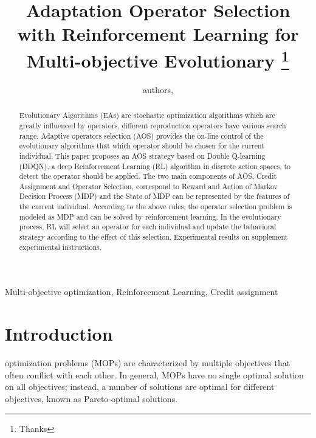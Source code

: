 \documentclass[journal]{IEEEtran}
\newcommand{\TODO}[1]{\textcolor[rgb]{1.00,0.40,0.22}{#1}}
\begin{document}
\title{{Adaptation Operator Selection with Reinforcement Learning for Multi-objective Evolutionary}
  \thanks{Thanks}}
\author{
  authors,
}%



\maketitle

\begin{abstract}
  Evolutionary Algorithms (EAs) are stochastic optimization algorithms which are greatly influenced by operators, different reproduction operators have various search range.
  Adaptive operators selection (AOS) provides the on-line control of the evolutionary algorithms that which operator should be chosen for the current individual.
  This paper proposes an AOS strategy based on Double Q-learning (DDQN), a deep Reinforcement Learning (RL) algorithm in discrete action spaces, to detect the operator should be applied.
  The two main components of AOS, Credit Assignment and Operator Selection, correspond to Reward and Action of Markov Decision Process (MDP) and the State of MDP can be represented by the features of the current individual. According to the above rules, the operator selection problem is modeled as MDP and can be solved by reinforcement learning. In the evolutionary process, RL will select an operator for each individual and update the behavioral strategy according to the effect of this selection. Experimental results on \TODO{supplement experimental instructions}.
\end{abstract}

\begin{IEEEkeywords}
  Multi-objective optimization, Reinforcement Learning, Credit assignment
\end{IEEEkeywords}

\section{Introduction}
 optimization problems (MOPs) are characterized by multiple objectives that often conflict with each other\cite{zhang2014efficient}. In general, MOPs have no single optimal solution on all objectives; instead, a number of solutions are optimal for different objectives, known as Pareto-optimal solutions.
\end{document}
